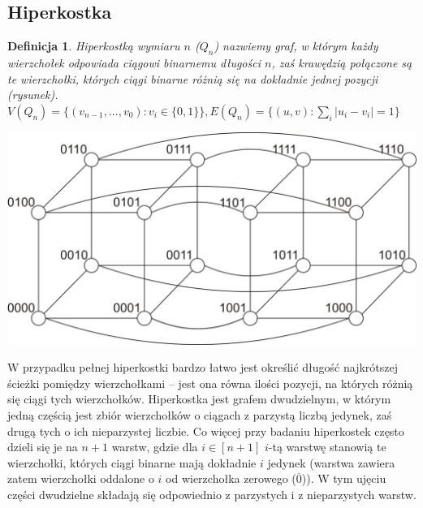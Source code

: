 \documentclass{pracamgr}
\newtheorem{defi}[theorem]{Definicja}
\begin{document}
   \subsection{Hiperkostka}
    \begin{defi}\label{hiperkostka}
     \emph{Hiperkostką wymiaru $n$ ($Q_n$)} nazwiemy graf, w którym każdy wierzchołek odpowiada ciągowi binarnemu długości $n$,
     zaś krawędzią połączone są te wierzchołki, których ciągi binarne różnią się na dokładnie jednej pozycji (rysunek).\newline
     $V(Q_n)=\{(v_{n-1},...,v_{0}):v_i\in\{0,1\}\}, E(Q_n)=\{(u,v):\sum_{i}|u_i-v_i|=1\}$
    \end{defi}
    \begin{center}
     \includegraphics[scale=0.6]{img/Q_4.jpg}
    \end{center}
    W przypadku pełnej hiperkostki
    bardzo łatwo jest określić długość najkrótszej ścieżki pomiędzy wierzchołkami --
    jest ona równa ilości pozycji, na których różnią się ciągi tych wierzchołków.\newline
    Hiperkostka jest grafem dwudzielnym, w którym jedną częścią jest zbiór wierzchołków o ciągach z parzystą liczbą jedynek,
    zaś drugą tych o ich nieparzystej liczbie.\newline
    Co więcej przy badaniu hiperkostek często dzieli się je na $n+1$ warstw, gdzie dla $i\in[n+1]$ $i$-tą warstwę stanowią te wierzchołki,
    których ciągi binarne mają dokładnie $i$ jedynek (warstwa zawiera zatem wierzchołki oddalone o $i$ od wierzchołka zerowego ($\overline{0}$)).
    W tym ujęciu części dwudzielne składają się odpowiednio z parzystych i z nieparzystych warstw.
    
\end{document}
